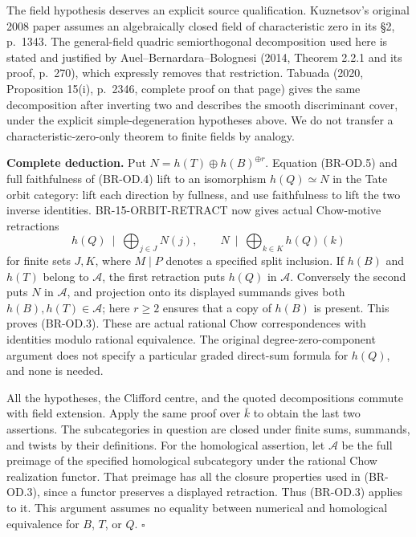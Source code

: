 The field hypothesis deserves an explicit source qualification.
Kuznetsov's original 2008 paper assumes an algebraically closed field
of characteristic zero in its \S2, p.~1343. The general-field
quadric semiorthogonal decomposition used here is stated and justified
by Auel--Bernardara--Bolognesi (2014, Theorem 2.2.1 and its proof,
p.~270), which expressly removes that restriction. Tabuada (2020,
Proposition 15(i), p.~2346, complete proof on that page) gives the same
decomposition after inverting two and describes the smooth discriminant
cover, under the explicit simple-degeneration hypotheses above. We do
not transfer a characteristic-zero-only theorem to finite fields by
analogy.

\textbf{Complete deduction.} Put $N=h(T)\oplus h(B)^{\oplus r}$.
Equation (BR-OD.5) and full faithfulness of (BR-OD.4) lift to an
isomorphism $h(Q)\simeq N$ in the Tate orbit category: lift each
direction by fullness, and use faithfulness to lift the two inverse
identities. BR-15-ORBIT-RETRACT now gives actual Chow-motive
retractions
\[
 h(Q)\ \mid\ \bigoplus_{j\in J}N(j),\qquad
 N\ \mid\ \bigoplus_{k\in K}h(Q)(k) \tag{BR-OD.6}
\]
for finite sets $J,K$, where $M\mid P$ denotes a specified split
inclusion. If $h(B)$ and $h(T)$ belong to $\mathcal A$, the first
retraction puts $h(Q)$ in $\mathcal A$. Conversely the second puts
$N$ in $\mathcal A$, and projection onto its displayed summands gives
both $h(B),h(T)\in\mathcal A$; here $r\ge2$ ensures that a copy of
$h(B)$ is present. This proves (BR-OD.3). These are actual rational
Chow correspondences with identities modulo rational equivalence.
The original degree-zero-component argument does not specify a
particular graded direct-sum formula for $h(Q)$, and none is needed.

All the hypotheses, the Clifford centre, and the quoted decompositions
commute with field extension. Apply the same proof over $\bar k$ to
obtain the last two assertions. The subcategories in question are
closed under finite sums, summands, and twists by their definitions.
For the homological assertion, let $\mathcal A$ be the full preimage
of the specified homological subcategory under the rational Chow
realization functor. That preimage has all the closure properties used
in (BR-OD.3), since a functor preserves a displayed retraction. Thus
(BR-OD.3) applies to it. This argument assumes no equality between
numerical and homological equivalence for $B$, $T$, or $Q$.
$\square$

